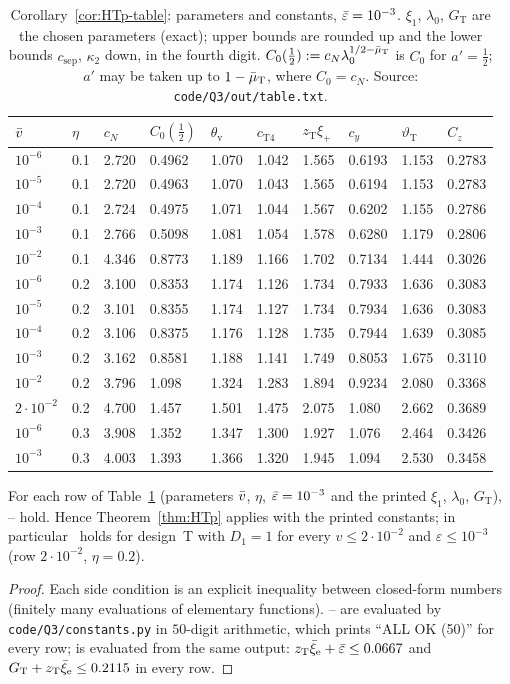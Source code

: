 \begin{table}[ht]
{\medskip
\begin{tabular}{@{}ll|llllllll@{}}
\toprule
$\bar v$&$\eta$&$c_N$&$C_0(\frac12)$&$\theta_{\mathrm v}$&$c_{\mathrm T4}$&$z_{\mathrm T}\xi_+$&$c_y$&$\vartheta_{\mathrm T}$&$C_z$\\
\midrule
$10^{-6}$&0.1&2.720&0.4962&1.070&1.042&1.565&0.6193&1.153&0.2783\\
$10^{-5}$&0.1&2.720&0.4963&1.070&1.043&1.565&0.6194&1.153&0.2783\\
$10^{-4}$&0.1&2.724&0.4975&1.071&1.044&1.567&0.6202&1.155&0.2786\\
$10^{-3}$&0.1&2.766&0.5098&1.081&1.054&1.578&0.6280&1.179&0.2806\\
$10^{-2}$&0.1&4.346&0.8773&1.189&1.166&1.702&0.7134&1.444&0.3026\\
$10^{-6}$&0.2&3.100&0.8353&1.174&1.126&1.734&0.7933&1.636&0.3083\\
$10^{-5}$&0.2&3.101&0.8355&1.174&1.127&1.734&0.7934&1.636&0.3083\\
$10^{-4}$&0.2&3.106&0.8375&1.176&1.128&1.735&0.7944&1.639&0.3085\\
$10^{-3}$&0.2&3.162&0.8581&1.188&1.141&1.749&0.8053&1.675&0.3110\\
$10^{-2}$&0.2&3.796&1.098&1.324&1.283&1.894&0.9234&2.080&0.3368\\
$2\cdot10^{-2}$&0.2&4.700&1.457&1.501&1.475&2.075&1.080&2.662&0.3689\\
$10^{-6}$&0.3&3.908&1.352&1.347&1.300&1.927&1.076&2.464&0.3426\\
$10^{-3}$&0.3&4.003&1.393&1.366&1.320&1.945&1.094&2.530&0.3458\\
\bottomrule
\end{tabular}}
\caption{Corollary~\ref{cor:HTp-table}: parameters and constants, $\bar\varepsilon=10^{-3}$. $\xi_1$, $\lambda_0$, $G_{\mathrm T}$ are the chosen
parameters (exact); upper bounds are rounded up and the lower bounds $c_{\mathrm{sep}}$, $\kappa_2$ down, in the fourth digit.
$C_0(\frac12):=c_N\lambda_0^{1/2-\bar\mu_{\mathrm T}}$ is $C_0$ for $a'=\frac12$; $a'$ may be taken up to $1-\bar\mu_{\mathrm T}$, where $C_0=c_N$.
Source: \texttt{code/Q3/out/table.txt}.}
\label{tab:HTp}
\end{table}

\begin{corollary}\label{cor:HTp-table}
For each row of Table~\ref{tab:HTp} (parameters $\bar v$, $\eta$, $\bar\varepsilon=10^{-3}$ and the printed $\xi_1$, $\lambda_0$, $G_{\mathrm T}$),
-- hold. Hence Theorem~\ref{thm:HTp} applies with the printed constants; in particular \MHT\ holds for design~T with
$D_1=1$ for every $v\le2\cdot10^{-2}$ and $\varepsilon\le10^{-3}$ (row $2\cdot10^{-2}$, $\eta=0.2$).
\end{corollary}
\begin{proof}
Each side condition is an explicit inequality between closed-form numbers (finitely many evaluations of elementary functions).
-- are evaluated by \texttt{code/Q3/constants.py} in $50$-digit arithmetic, which prints ``ALL OK (50)'' for every row;
 is evaluated from the same output: $z_{\mathrm T}\bar\xi_{\mathrm e}+\bar\varepsilon\le0.0667$ and $G_{\mathrm T}+z_{\mathrm T}\bar\xi_{\mathrm e}\le0.2115$ in every row.
\end{proof}

